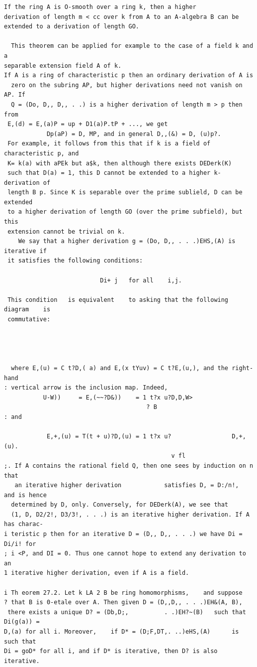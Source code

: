 \begin{theorem}\label{mcrt-auto-theorem-27-1}\uses{}
\begin{verbatim}
If the ring A is O-smooth over a ring k, then a higher
derivation of length m < cc over k from A to an A-algebra B can be
extended to a derivation of length GO.

  This theorem can be applied for example to the case of a field k and a
separable extension field A of k.
If A is a ring of characteristic p then an ordinary derivation of A is
  zero on the subring AP, but higher derivations need not vanish on AP. If
  Q = (Do, D,, D,, . .) is a higher derivation of length m > p then from
 E,(d) = E,(a)P = up + D1(a)P.tP + ..., we get
            Dp(aP) = D, MP, and in general D,,(&) = D, (u)p?.
 For example, it follows from this that if k is a field of characteristic p, and
 K= k(a) with aPEk but a$k, then although there exists DEDerk(K)
 such that D(a) = 1, this D cannot be extended to a higher k-derivation of
 length B p. Since K is separable over the prime sublield, D can be extended
 to a higher derivation of length GO (over the prime subfield), but this
 extension cannot be trivial on k.
    We say that a higher derivation g = (Do, D,, . . .)EHS,(A) is iterative if
 it satisfies the following conditions:

                           Di+ j   for all    i,j.

 This condition   is equivalent    to asking that the following     diagram    is
 commutative:




  where E,(u) = C t?D,( a) and E,(x tYuv) = C t?E,(u,), and the right-hand
: vertical arrow is the inclusion map. Indeed,
           U-W))     = E,(~~?D&))    = 1 t?x u?D,D,W>
                                        ? B
: and

            E,+,(u) = T(t + u)?D,(u) = 1 t?x u?                 D,+,(u).
                                               v fl
;. If A contains the rational field Q, then one sees by induction on n that
   an iterative higher derivation            satisfies D, = D:/n!,   and is hence
  determined by D, only. Conversely, for DEDerk(A), we see that
  (1, D, D2/2!, D3/3!, . . .) is an iterative higher derivation. If A has charac-
i teristic p then for an iterative D = (D,, D,, . . .) we have Di = Di/i! for
; i <P, and DI = 0. Thus one cannot hope to extend any derivation to an
1 iterative higher derivation, even if A is a field.

i Th eorem 27.2. Let k LA 2 B be ring homomorphisms,    and suppose
? that B is 0-etale over A. Then given D = (D,,D,, . . .)EH&(A, B),
 there exists a unique D? = (Db,D;,          . .)EH?~(B)   such that Di(g(a)) =
D,(a) for all i. Moreover,    if D* = (D;F,DT,. ..)eHS,(A)      is such that
Di = goD* for all i, and if D* is iterative, then D? is also iterative.
\end{verbatim}
\end{theorem}
